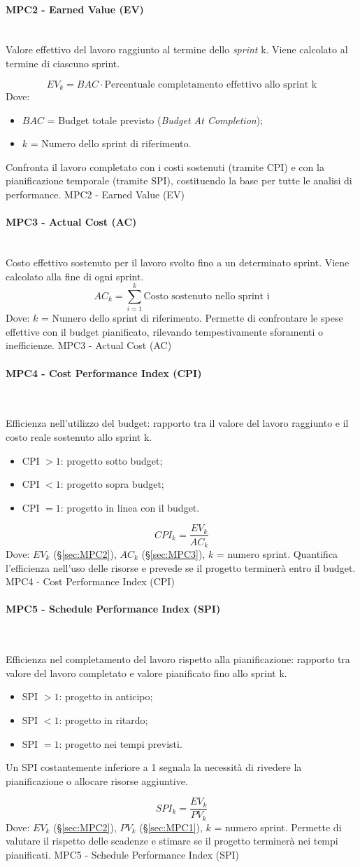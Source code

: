 \documentclass[10pt, letterpaper]{article}
\newcommand{\trisubsection}[1]{\paragraph{#1}\mbox{}\\}
\begin{document}
\trisubsection{MPC2 - Earned Value (EV)}
\label{sec:MPC2}
{Valore effettivo del lavoro raggiunto al termine dello \textit{sprint} k. Viene calcolato al termine di ciascuno sprint.}
{\[ EV_k = BAC \cdot \mbox{Percentuale completamento effettivo allo sprint k} \] Dove:
    \begin{itemize}
        \item $BAC$ = Budget totale previsto (\textit{Budget At Completion});
        \item $k$ = Numero dello sprint di riferimento.
    \end{itemize}
}
{Confronta il lavoro completato con i costi sostenuti (tramite CPI) e con la pianificazione temporale (tramite SPI), costituendo la base per tutte le analisi di performance.}
{MPC2 - Earned Value (EV)}

\trisubsection{MPC3 - Actual Cost (AC)}
\label{sec:MPC3}
{Costo effettivo sostenuto per il lavoro svolto fino a un determinato sprint. Viene calcolato alla fine di ogni sprint.}
{\[ AC_k = \sum_{i=1}^{k} \mbox{Costo sostenuto nello sprint i} \]
    Dove: $k$ = Numero dello sprint di riferimento.
}
{Permette di confrontare le spese effettive con il budget pianificato, rilevando tempestivamente sforamenti o inefficienze.}
{MPC3 - Actual Cost (AC)}

\trisubsection{MPC4 - Cost Performance Index (CPI)}
\label{sec:MPC4}
{Efficienza nell'utilizzo del budget: rapporto tra il valore del lavoro raggiunto e il costo reale sostenuto allo sprint k.
    \begin{itemize}
        \item CPI $> 1$: progetto sotto budget;
        \item CPI $< 1$: progetto sopra budget;
        \item CPI $= 1$: progetto in linea con il budget.
    \end{itemize}}
{\[ CPI_k = \frac{EV_k}{AC_k} \]
    Dove: $EV_k$ (§\ref{sec:MPC2}), $AC_k$ (§\ref{sec:MPC3}), $k$ = numero sprint.
}
{Quantifica l'efficienza nell'uso delle risorse e prevede se il progetto terminerà entro il budget.}
{MPC4 - Cost Performance Index (CPI)}

\trisubsection{MPC5 - Schedule Performance Index (SPI)}
\label{sec:MPC5}
{Efficienza nel completamento del lavoro rispetto alla pianificazione: rapporto tra valore del lavoro completato e valore pianificato fino allo sprint k.
    \begin{itemize}
        \item SPI $> 1$: progetto in anticipo;
        \item SPI $< 1$: progetto in ritardo;
        \item SPI $= 1$: progetto nei tempi previsti.
    \end{itemize}
    Un SPI costantemente inferiore a 1 segnala la necessità di rivedere la pianificazione o allocare risorse aggiuntive.}
{\[ SPI_k = \frac{EV_k}{PV_k} \]
    Dove: $EV_k$ (§\ref{sec:MPC2}), $PV_k$ (§\ref{sec:MPC1}), $k$ = numero sprint.}
{Permette di valutare il rispetto delle scadenze e stimare se il progetto terminerà nei tempi pianificati.}
{MPC5 - Schedule Performance Index (SPI)}
\end{document}
